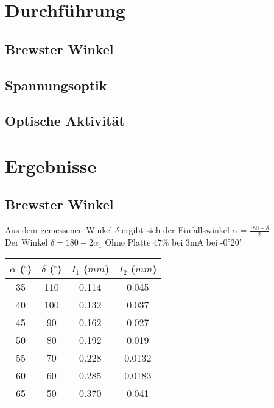 \documentclass{article}
\begin{document}
\section{Durchführung}
\subsection{Brewster Winkel}
\subsection{Spannungsoptik}
\subsection{Optische Aktivität}

\section{Ergebnisse}
\subsection{Brewster Winkel}
Aus dem gemessenen Winkel $\delta$ ergibt sich der Einfallswinkel $\alpha=\frac{180-\delta}{2}$\\
Der Winkel $\delta=180-2\alpha_1$
Ohne Platte 47\% bei 3mA bei -0°20'

\begin{table}[H]
\begin{center}
\begin{tabular}{|c|c|c|c|}
\hline
$\alpha$ ($^\circ$) & $\delta$ ($^\circ$) & $I_1$ ($mm$) & $I_2$ ($mm$)\\
\hline
35 & 110 & 0.114 & 0.045\\
40 & 100 & 0.132 & 0.037\\
45 & 90 & 0.162 & 0.027\\
50 & 80 & 0.192 & 0.019\\
55 & 70 & 0.228 & 0.0132\\
60 & 60 & 0.285 & 0.0183\\
65 & 50 & 0.370 & 0.041\\
\hline
\end{tabular}
\end{center}
\end{table}

\end{document}

